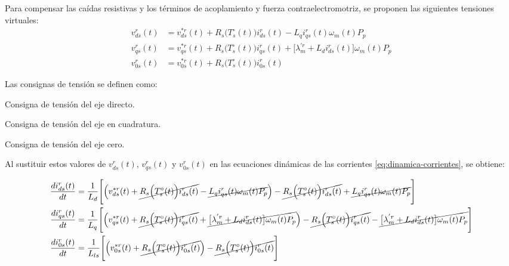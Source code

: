 \documentclass[blue,fullpaper]{ludusofficial}  %
\begin{document}
Para compensar las caídas resistivas y los términos de acoplamiento y fuerza contraelectromotriz, se proponen las siguientes tensiones virtuales:
\begin{align}
v_{ds}^{r}(t) & = v_{ds}^{*r}(t) + R_{s} \Big( T_{s}^{\circ} (t) \Big) i_{ds}^{r}(t) - L_{q}i_{qs}^{r}(t) \omega_{m}(t)P_{p}
\label{eq:compensacion-tension-d} \\
v_{qs}^{r}(t) & = v_{qs}^{*r}(t) + R_{s} \Big( T_{s}^{\circ} (t) \Big) i_{qs}^{r}(t) + \big[ \lambda_{m}^{'r} + L_{d} i_{ds}^{r}(t) \big] \omega_{m}(t)P_{p}
\label{eq:compensacion-tension-q} \\
v_{0s}^{r}(t) & = v_{0s}^{*r}(t) + R_{s} \Big( T_{s}^{\circ} (t) \Big) i_{0s}^{r}(t)
\label{eq:compensacion-tension-cero}
\end{align}

\noindent Las consignas de tensión se definen como:
\begin{description}[
    leftmargin=2.5cm,
    labelwidth=2cm,
    labelsep=0.5cm,
    align=left,
    font=\normalfont
]
    \item[$v_{ds}^{*r}(t)$] Consigna de tensión del eje directo.
    \item[$v_{qs}^{*r}(t)$] Consigna de tensión del eje en cuadratura.
    \item[$v_{0s}^{*r}(t)$] Consigna de tensión del eje cero.
\end{description}

Al sustituir estos valores de $v_{ds}^{r}(t)$, $v_{qs}^{r}(t)$ y $v_{0s}^{r}(t)$ en las ecuaciones dinámicas de las corrientes \eqref{eq:dinamica-corrientes}, se obtiene:

\begin{align*}
\frac{di_{ds}^{r}(t)}{dt} & = \frac{1}{L_{d}} \Bigg[ \Big( v_{ds}^{*r}(t) + \cancel{ R_{s} \Big( T_{s}^{\circ} (t) \Big) i_{ds}^{r}(t) } - \cancel{ L_{q}i_{qs}^{r}(t) \omega_{m}(t)P_{p} } \Big) - \cancel{ R_{s} \Big( T_{s}^{\circ} (t) \Big) i_{ds}^{r}(t) } + \cancel{ L_{q}i_{qs}^{r}(t) \omega_{m}(t)P_{p}  } \Bigg]  \\
\frac{di_{qs}^{r}(t)}{dt}  & = \frac{1}{L_{q} } \Bigg[ \Big( v_{qs}^{*r}(t) +\cancel{  R_{s} \Big( T_{s}^{\circ} (t) \Big) i_{qs}^{r}(t) } +\cancel{  \big[ \lambda_{m}^{'r} + L_{d} i_{ds}^{r}(t) \big] \omega_{m}(t)P_{p}  } \Big) - \cancel{ R_{s} \Big( T_{s}^{\circ} (t) \Big) i_{qs}^{r}(t) } - \cancel{ \big[ \lambda_{m}^{'r} + L_{d} i_{ds}^{r}(t) \big] \omega_{m}(t)P_{p}  }\Bigg]  \\
\frac{di_{0s}^{r}(t)}{dt} & = \frac{1}{ L_{ls} } \Bigg[ \Big( v_{0s}^{*r}(t) + \cancel{ R_{s} \Big( T_{s}^{\circ} (t) \Big) i_{0s}^{r}(t) }  \Big) -\cancel{  R_{s} \Big( T_{s}^{\circ} (t) \Big) i_{0s}^{r}(t) } \Bigg]
\end{align*}
\end{document}
